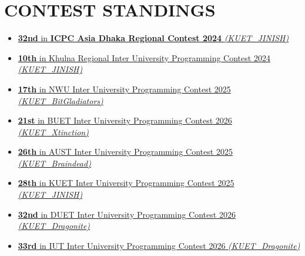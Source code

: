 \documentclass[letterpaper,10pt]{article}
\begin{document}
\section{CONTEST STANDINGS}
\begin{itemize}[leftmargin=0.2in, itemsep=0pt, parsep=2pt, topsep=3pt]

    \item \href{https://bapsoj.org/contests/icpc-asia-dhaka-regional-contest-2024-onsite-round/standings}{\textbf{32nd} in \textbf{ICPC Asia Dhaka Regional Contest 2024} \textit{(KUET\_JINISH)}}

    \item \href{https://toph.co/c/khulna-regional-inter-university-kriupc/standings}{\textbf{10th} in Khulna Regional Inter University Programming Contest 2024 \textit{(KUET\_JINISH)}}

    \item \href{https://www.coderoj.com/c/nwu-cse-fest-2025/standings}{\textbf{17th} in NWU Inter University Programming Contest 2025 \textit{(KUET\_BitGladiators)}}

    \item \href{https://toph.co/c/inter-university-buet-cse-fest-2026/standings}{\textbf{21st} in BUET Inter University Programming Contest 2026 \textit{(KUET\_Xtinction)}}

    \item \href{https://toph.co/c/mtb-presents-aust-inter-university-2025/standings}{\textbf{26th} in AUST Inter University Programming Contest 2025 \textit{(KUET\_Braindead)}}

    \item \href{https://bapsoj.org/contests/miaki-presents-kuet-iupc-onsite-2025/standings}{\textbf{28th} in KUET Inter University Programming Contest 2025 \textit{(KUET\_JINISH)}}

    \item \href{https://toph.co/c/duet-inter-university-2026/standings}{\textbf{32nd} in DUET Inter University Programming Contest 2026 \textit{(KUET\_Dragonite)}}



    \item \href{https://toph.co/c/iut-inter-university-2026/standings}{\textbf{33rd} in IUT Inter University Programming Contest 2026 \textit{(KUET\_Dragonite)}}

\end{itemize}
\vspace{-15pt}

\end{document}
